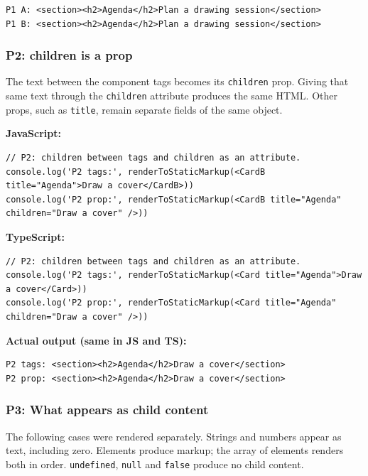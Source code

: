 \documentclass[
  11pt,
]{article}
\newcommand{\passthrough}[1]{#1}
\begin{document}
\begin{lstlisting}
P1 A: <section><h2>Agenda</h2>Plan a drawing session</section>
P1 B: <section><h2>Agenda</h2>Plan a drawing session</section>
\end{lstlisting}

\subsubsection{P2: children is a prop}\label{p2-children-is-a-prop}

The text between the component tags becomes its
\passthrough{\lstinline!children!} prop. Giving that same text through
the \passthrough{\lstinline!children!} attribute produces the same HTML.
Other props, such as \passthrough{\lstinline!title!}, remain separate
fields of the same object.

\textbf{JavaScript:}

\begin{lstlisting}
// P2: children between tags and children as an attribute.
console.log('P2 tags:', renderToStaticMarkup(<CardB title="Agenda">Draw a cover</CardB>))
console.log('P2 prop:', renderToStaticMarkup(<CardB title="Agenda" children="Draw a cover" />))
\end{lstlisting}

\textbf{TypeScript:}

\begin{lstlisting}
// P2: children between tags and children as an attribute.
console.log('P2 tags:', renderToStaticMarkup(<Card title="Agenda">Draw a cover</Card>))
console.log('P2 prop:', renderToStaticMarkup(<Card title="Agenda" children="Draw a cover" />))
\end{lstlisting}

\textbf{Actual output (same in JS and TS):}

\begin{lstlisting}
P2 tags: <section><h2>Agenda</h2>Draw a cover</section>
P2 prop: <section><h2>Agenda</h2>Draw a cover</section>
\end{lstlisting}

\subsubsection{P3: What appears as child
content}\label{p3-what-appears-as-child-content}

The following cases were rendered separately. Strings and numbers appear
as text, including zero. Elements produce markup; the array of elements
renders both in order. \passthrough{\lstinline!undefined!},
\passthrough{\lstinline!null!} and \passthrough{\lstinline!false!}
produce no child content.
\end{document}
